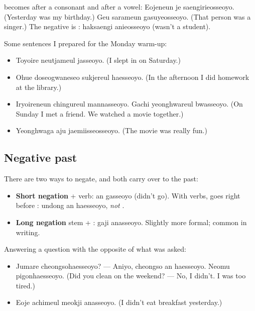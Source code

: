 \begin{important}
 becomes  after a consonant and  after a vowel:
 Eojeneun je saengirieosseoyo. (Yesterday was my birthday.)
 Geu sarameun gasuyeosseoyo. (That person was a singer.) The
negative is :  haksaengi anieosseoyo (wasn't a
student).
\end{important}

\begin{example}
Some sentences I prepared for the Monday warm-up:
\begin{itemize}
  \item {} Toyoire neutjameul jasseoyo. (I slept in on
        Saturday.)
  \item {} Ohue doseogwaneseo sukjereul haesseoyo. (In
        the afternoon I did homework at the library.)
  \item {} Iryoireneun chingureul
        mannasseoyo. Gachi yeonghwareul bwasseoyo. (On Sunday I met a friend. We watched
        a movie together.)
  \item {} Yeonghwaga aju jaemiisseosseoyo. (The movie was
        really fun.)
\end{itemize}
\end{example}

\subsection{Negative past}

There are two ways to negate, and both carry over to the past:
\begin{itemize}
  \item \textbf{Short negation}  + verb:  an gasseoyo (didn't go).
        With  verbs,  goes right before :
         undong an haesseoyo, \emph{not} .
  \item \textbf{Long negation} stem + :  gaji
        anasseoyo. Slightly more formal; common in writing.
\end{itemize}

\begin{example}
Answering a question with the opposite of what was asked:
\begin{itemize}
  \item {} Jumare
        cheongsohaesseoyo? --- Aniyo, cheongso an haesseoyo. Neomu pigonhaesseoyo. (Did
        you clean on the weekend? --- No, I didn't. I was too tired.)
  \item {} Eoje achimeul meokji anasseoyo. (I didn't eat
        breakfast yesterday.)
\end{itemize}
\end{example}

